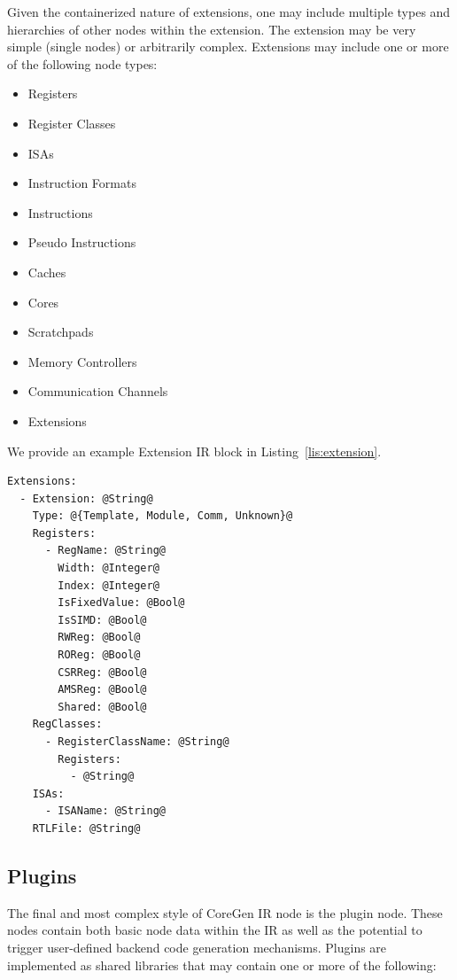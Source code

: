 \documentclass{article}
\begin{document}
Given the containerized nature of extensions, one may include multiple types and hierarchies of other nodes 
within the extension.  The extension may be very simple (single nodes) or arbitrarily complex.  Extensions may 
include one or more of the following node types: 

\begin{itemize}
\item Registers
\item Register Classes
\item ISAs
\item Instruction Formats
\item Instructions
\item Pseudo Instructions
\item Caches
\item Cores
\item Scratchpads
\item Memory Controllers
\item Communication Channels
\item Extensions
\end{itemize}

We provide an example Extension IR block in Listing~\ref{lis:extension}.  

\clearpage
\vspace{0.125in}
\begin{lstlisting}[frame=single,style=base,caption={Extension Node Definition},captionpos=b,label={lis:extension}]
Extensions:
  - Extension: @String@
    Type: @{Template, Module, Comm, Unknown}@
    Registers:
      - RegName: @String@
        Width: @Integer@
        Index: @Integer@
        IsFixedValue: @Bool@
        IsSIMD: @Bool@
        RWReg: @Bool@
        ROReg: @Bool@
        CSRReg: @Bool@
        AMSReg: @Bool@
        Shared: @Bool@
    RegClasses:
      - RegisterClassName: @String@
        Registers:
          - @String@
    ISAs:
      - ISAName: @String@
    RTLFile: @String@
\end{lstlisting}

\clearpage
\subsection{Plugins}
\label{sec:PluginNodes}

The final and most complex style of CoreGen IR node is the plugin node.  These nodes contain both 
basic node data within the IR as well as the potential to trigger user-defined backend code generation 
mechanisms.  Plugins are implemented as shared libraries that may contain one or more of the following: 
\end{document}
